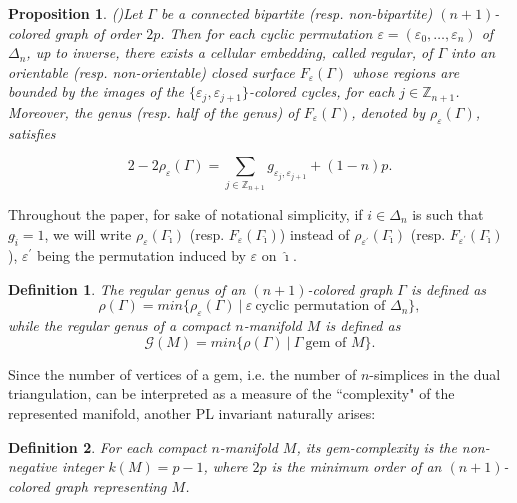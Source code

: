 \documentclass[12pt,a4paper]{article}
\newtheorem{proposition}[lemma]{Proposition}
\newtheorem{definition}{Definition}
\newcommand{\e}{\varepsilon}
\newcommand{\G}{\Gamma}
\begin{document}
\begin{proposition}{\em (\cite{Ferri-Gagliardi-Grasselli})}\label{reg_emb}
Let $\G$ be a connected bipartite (resp. non-bipartite) 
$(n+1)$-colored graph of order $2p$. Then for each cyclic permutation $\varepsilon = (\varepsilon_0,\ldots,\varepsilon_n)$ of $\Delta_n$, up to inverse, there exists a cellular embedding, called \emph{regular}, of $\G$  
into an orientable (resp. non-orientable)
closed surface $F_{\varepsilon}(\G)$ whose regions are bounded by the images of the $\{\varepsilon_j,\varepsilon_{j+1}\}$-colored cycles, for each $j \in \mathbb Z_{n+1}$.
Moreover, the genus (resp. half of the genus)  of $F_{\varepsilon}(\G)$, denoted by $\rho_{\varepsilon} (\G)$,  satisfies

\begin{equation*}
2 - 2\rho_\varepsilon(\G)= \sum_{j\in \mathbb{Z}_{n+1}} g_{\varepsilon_j, \varepsilon_{j+1}} + (1-n)p.
\end{equation*}

\end{proposition}

Throughout the paper, for sake of notational simplicity, if $i \in \Delta_n$ is such that $g_{\hat i}=1$, we will write $\rho_{\varepsilon}(\G_{\hat\imath})$  (resp. $F_{\varepsilon}(\G_{\hat\imath})$) instead of  $\rho_{\varepsilon^\prime}(\G_{\hat\imath})$ (resp. $F_{\varepsilon^\prime}(\G_{\hat\imath})$), $\e^\prime$ being the permutation induced by $\e$ on $\hat\imath$. 

\medskip 

\begin{definition} {\em The \emph{regular genus} of  an $(n+1)$-colored graph $\G$ is defined as
$$\rho(\G) = min\{\rho_\varepsilon(\G)\ \vert \ \varepsilon\ \text{cyclic permutation of \ } \Delta_n\},$$
while the  {\it regular genus} of a compact $n$-manifold $M$ is defined as
$$\mathcal G (M) = min\{\rho(\G)\ \vert \ \G\ \text{gem of \ } M\}.$$  }
\end{definition}


\bigskip 

Since the number of vertices of a gem, i.e. the number of $n$-simplices in the dual triangulation, can be interpreted as a measure of the ``complexity" of the represented manifold, another PL invariant naturally arises:

\begin{definition} \label{def. gem-complexity}
{\em For each compact $n$-manifold $M$, its \emph{gem-complexity} is the non-negative integer $k(M)= p - 1$, 
where $2p$ is the minimum order of an $(n+1)$-colored graph representing $M$.  }
\end{definition}
\end{document}
